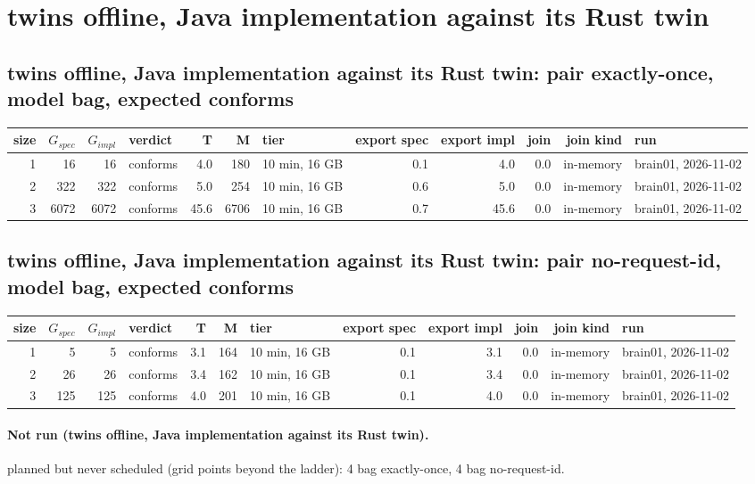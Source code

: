 \documentclass[10pt]{article}
\begin{document}
\section*{twins offline, Java implementation against its Rust twin}
\subsection*{twins offline, Java implementation against its Rust twin: pair \textsf{exactly-once}, model bag, expected conforms}
\begin{longtable}{@{}rrrlrrlrrrrl@{}}
\toprule
size & $G_{\mathit{spec}}$ & $G_{\mathit{impl}}$ & verdict & T & M & tier & export spec & export impl & join & join kind & run \\
\midrule
\endhead
\color{red} 1 & 16 & 16 & conforms & 4.0 & 180 & 10 min, 16 GB & 0.1 & 4.0 & 0.0 & in-memory & brain01, 2026-11-02 \\
\color{red} 2 & 322 & 322 & conforms & 5.0 & 254 & 10 min, 16 GB & 0.6 & 5.0 & 0.0 & in-memory & brain01, 2026-11-02 \\
\color{red} 3 & 6072 & 6072 & conforms & 45.6 & 6706 & 10 min, 16 GB & 0.7 & 45.6 & 0.0 & in-memory & brain01, 2026-11-02 \\
\bottomrule
\end{longtable}
\subsection*{twins offline, Java implementation against its Rust twin: pair \textsf{no-request-id}, model bag, expected conforms}
\begin{longtable}{@{}rrrlrrlrrrrl@{}}
\toprule
size & $G_{\mathit{spec}}$ & $G_{\mathit{impl}}$ & verdict & T & M & tier & export spec & export impl & join & join kind & run \\
\midrule
\endhead
\color{red} 1 & 5 & 5 & conforms & 3.1 & 164 & 10 min, 16 GB & 0.1 & 3.1 & 0.0 & in-memory & brain01, 2026-11-02 \\
\color{red} 2 & 26 & 26 & conforms & 3.4 & 162 & 10 min, 16 GB & 0.1 & 3.4 & 0.0 & in-memory & brain01, 2026-11-02 \\
\color{red} 3 & 125 & 125 & conforms & 4.0 & 201 & 10 min, 16 GB & 0.1 & 4.0 & 0.0 & in-memory & brain01, 2026-11-02 \\
\bottomrule
\end{longtable}
\paragraph{Not run (twins offline, Java implementation against its Rust twin).}
planned but never scheduled (grid points beyond the ladder): 4 bag exactly-once, 4 bag no-request-id.\par
\end{document}

